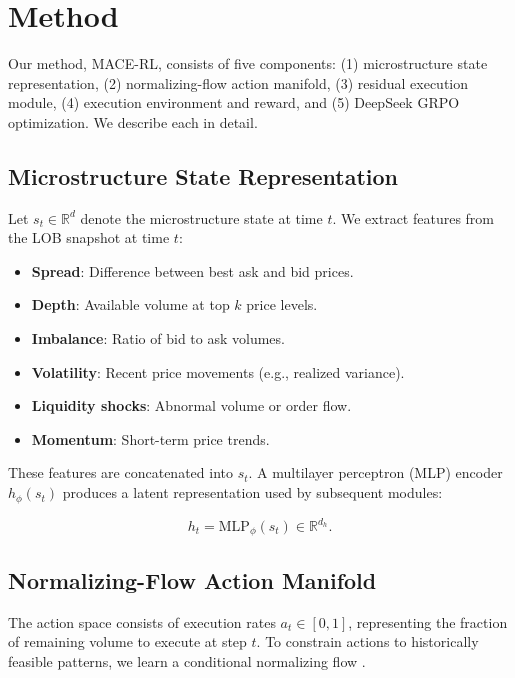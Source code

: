 \documentclass{article}
\newcommand{\R}{\mathbb{R}}
\begin{document}
\section{Method}
\label{sec:method}

Our method, MACE-RL, consists of five components: (1) microstructure state representation, (2) normalizing-flow action manifold, (3) residual execution module, (4) execution environment and reward, and (5) DeepSeek GRPO optimization. We describe each in detail.

\subsection{Microstructure State Representation}
\label{subsec:state}

Let $s_t \in \R^d$ denote the microstructure state at time $t$. We extract features from the LOB snapshot at time $t$:

\begin{itemize}
    \item \textbf{Spread}: Difference between best ask and bid prices.
    \item \textbf{Depth}: Available volume at top $k$ price levels.
    \item \textbf{Imbalance}: Ratio of bid to ask volumes.
    \item \textbf{Volatility}: Recent price movements (e.g., realized variance).
    \item \textbf{Liquidity shocks}: Abnormal volume or order flow.
    \item \textbf{Momentum}: Short-term price trends.
\end{itemize}

These features are concatenated into $s_t$. A multilayer perceptron (MLP) encoder $h_\phi(s_t)$ produces a latent representation used by subsequent modules:

\begin{equation}
    h_t = \text{MLP}_\phi(s_t) \in \R^{d_h}.
\end{equation}

\subsection{Normalizing-Flow Action Manifold}
\label{subsec:flow}

The action space consists of execution rates $a_t \in [0,1]$, representing the fraction of remaining volume to execute at step $t$. To constrain actions to historically feasible patterns, we learn a conditional normalizing flow \citep{rezende2015variational}.
\end{document}
